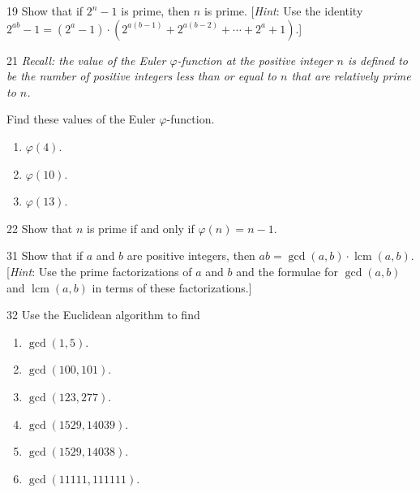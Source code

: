 \documentclass[11pt]{article}
\begin{document}
\begin{exercise}{19}
    Show that if $2^n - 1$ is prime, then $n$ is prime.
    [\emph{Hint}: Use the identity
    $2^{ab} - 1 = (2^a - 1) \cdot (2^{a(b-1)} + 2^{a(b-2)} + \cdots +
    2^a + 1)$.]
\end{exercise}

\begin{exercise}{21}
    \textit{Recall: the value of the Euler $\varphi$-function at the
    positive integer $n$ is defined to be the number of positive
    integers less than or equal to $n$ that are relatively prime to
    $n$.}

    Find these values of the Euler $\varphi$-function.
    \begin{enumerate}[label=(\alph*)]
        \item $\varphi(4)$.
        \item $\varphi(10)$.
        \item $\varphi(13)$.
    \end{enumerate}
\end{exercise}

\begin{exercise}{22}
    Show that $n$ is prime if and only if $\varphi(n) = n - 1$.
\end{exercise}

\begin{exercise}{31}
    Show that if $a$ and $b$ are positive integers, then
    $ab = \gcd(a,b) \cdot \operatorname{lcm}(a,b)$.
    [\emph{Hint}: Use the prime factorizations of $a$ and $b$ and the
    formulae for $\gcd(a,b)$ and $\operatorname{lcm}(a,b)$ in terms
    of these factorizations.]
\end{exercise}

\begin{exercise}{32}
    Use the Euclidean algorithm to find
    \begin{enumerate}[label=(\alph*)]
        \item $\gcd(1,5)$.
        \item $\gcd(100,101)$.
        \item $\gcd(123,277)$.
        \item $\gcd(1529,14039)$.
        \item $\gcd(1529,14038)$.
        \item $\gcd(11111,111111)$.
    \end{enumerate}
\end{exercise}
\end{document}
